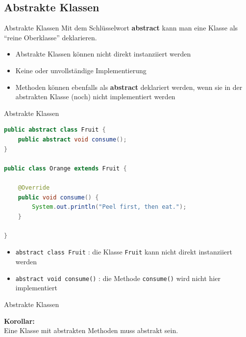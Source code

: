 \documentclass[18pt]{beamer}
\newcommand{\quotes}[1]{``#1''}
\begin{document}
\subsection{Abstrakte Klassen}

\begin{frame}{Abstrakte Klassen}
    Mit dem Schlüsselwort \textbf{abstract} kann man eine Klasse als \quotes{reine Oberklasse} deklarieren.

    \begin{itemize}
        \item Abstrakte Klassen können nicht direkt instanziiert werden
        \item Keine oder unvollständige Implementierung
        \item Methoden können ebenfalls als \textbf{abstract} deklariert werden, wenn sie in der abstrakten Klasse (noch) nicht implementiert werden
    \end{itemize}
\end{frame}

\begin{frame}[fragile]{Abstrakte Klassen}
    \begin{exampleblock}{}
        \begin{lstlisting}[language=Java,basicstyle=\scriptsize]
public abstract class Fruit {
    public abstract void consume();
}

public class Orange extends Fruit {

    @Override
    public void consume() {
        System.out.println("Peel first, then eat.");
    }

}
        \end{lstlisting}

    \end{exampleblock}

    \begin{itemize}
        \item \texttt{abstract class Fruit} : die Klasse \texttt{Fruit} kann nicht direkt instanziiert werden
        \item \texttt{abstract void consume()} : die Methode \texttt{consume()} wird nicht hier implementiert
    \end{itemize}

\end{frame}

\begin{frame}{Abstrakte Klassen}
    \begin{block}{}
        \textbf{Korollar:}\\
        Eine Klasse mit abstrakten Methoden muss abstrakt sein.
    \end{block}

\end{frame}
\end{document}
